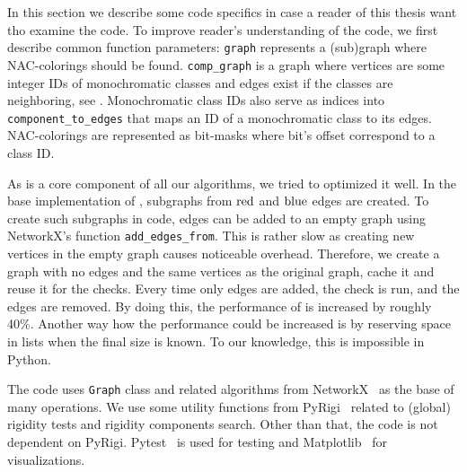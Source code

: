 In this section we describe some code specifics
in case a reader of this thesis want tho examine the code.
%
To improve reader's understanding of the code,
we first describe common function parameters:
\texttt{graph} represents a (sub)graph where NAC-colorings should be found.
%
\texttt{comp\_graph} is a graph where vertices are some integer IDs of monochromatic classes
and edges exist if the classes are neighboring,
see .
%
Monochromatic class IDs also serve as indices into \texttt{component\_to\_edges}
that maps an ID of a monochromatic class to its edges.
%
NAC-colorings are represented as bit-masks where bit's offset correspond to a class ID\@.

As \IsNACColoring{} is a core component of all our algorithms,
we tried to optimized it well.
%
In the base implementation of \IsNACColoring{},
subgraphs from \( \text{red} \) and \( \text{blue} \) edges are created.
To create such subgraphs in code, edges can be added to an empty graph
using NetworkX's function \texttt{add\_edges\_from}.
%
This is rather slow as creating new vertices in the empty graph causes noticeable overhead.
Therefore, we create a graph with no edges and the same vertices as the original graph,
cache it and reuse it for the checks.
Every time only edges are added, the check is run, and the edges are removed.
By doing this, the performance of \IsNACColoring{} is increased by roughly 40\%.
%
Another way how the performance could be increased is by reserving space in lists
when the final size is known.
To our knowledge, this is impossible in Python.

The code uses \texttt{Graph} class and related algorithms from NetworkX~\cite{networkx}
as the base of many operations. We use some utility functions from PyRigi~\cite{pyrigi}
related to (global) rigidity tests and rigidity components search.
Other than that, the code is not dependent on PyRigi.
%
Pytest~\cite{pytest} is used for testing and
Matplotlib~\cite{matplotlib} for visualizations.

